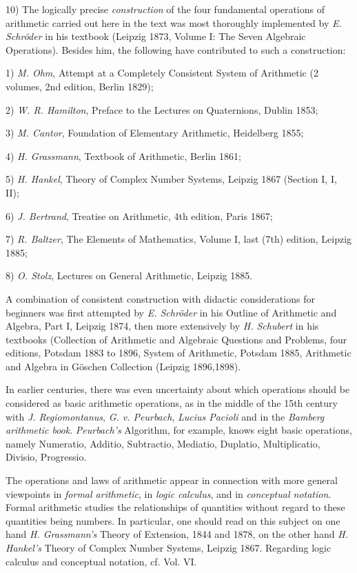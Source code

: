 \vspace{0.1cm}
\leftline{\rule{2in}{0.4pt}}
\vspace{0.2cm}
{
\footnotesize

10) The logically precise \textit{construction} of the four fundamental operations of arithmetic carried out here in the text was most thoroughly implemented by \textit{E. Schröder} in his textbook (Leipzig 1873, Volume I: The Seven Algebraic Operations). Besides him, the following have contributed to such a construction:

1) \textit{M. Ohm}, Attempt at a Completely Consistent System of Arithmetic (2 volumes, 2nd edition, Berlin 1829);

2) \textit{W. R. Hamilton}, Preface to the Lectures on Quaternions, Dublin 1853;

3) \textit{M. Cantor}, Foundation of Elementary Arithmetic, Heidelberg 1855;

4) \textit{H. Grassmann}, Textbook of Arithmetic, Berlin 1861;

5) \textit{H. Hankel}, Theory of Complex Number Systems, Leipzig 1867 (Section I, I, II);

6) \textit{J. Bertrand}, Treatise on Arithmetic, 4th edition, Paris 1867;

7) \textit{R. Baltzer}, The Elements of Mathematics, Volume I, last (7th) edition, Leipzig 1885;

8) \textit{O. Stolz}, Lectures on General Arithmetic, Leipzig 1885.

A combination of consistent construction with didactic considerations for beginners was first attempted by \textit{E. Schröder} in his Outline of Arithmetic and Algebra, Part I, Leipzig 1874, then more extensively by \textit{H. Schubert} in his textbooks (Collection of Arithmetic and Algebraic Questions and Problems, four editions, Potsdam 1883 to 1896, System of Arithmetic, Potsdam 1885, Arithmetic and Algebra in Göschen Collection (Leipzig 1896,1898).

In earlier centuries, there was even uncertainty about which operations should be considered as basic arithmetic operations, as in the middle of the 15th century with \textit{J. Regiomontanus}, \textit{G. v. Peurbach}, \textit{Lucius Pacioli} and in the \textit{Bamberg arithmetic book}. \textit{Peurbach's} Algorithm, for example, knows eight basic operations, namely Numeratio, Additio, Subtractio, Mediatio, Duplatio, Multiplicatio, Divisio, Progressio.

The operations and laws of arithmetic appear in connection with more general viewpoints in \textit{formal arithmetic}, in \textit{logic calculus}, and in \textit{conceptual notation}. Formal arithmetic studies the relationships of quantities without regard to these quantities being numbers. In particular, one should read on this subject on one hand \textit{H. Grassmann's} Theory of Extension, 1844 and 1878, on the other hand \textit{H. Hankel's} Theory of Complex Number Systems, Leipzig 1867. Regarding logic calculus and conceptual notation, cf. Vol. VI.

}

